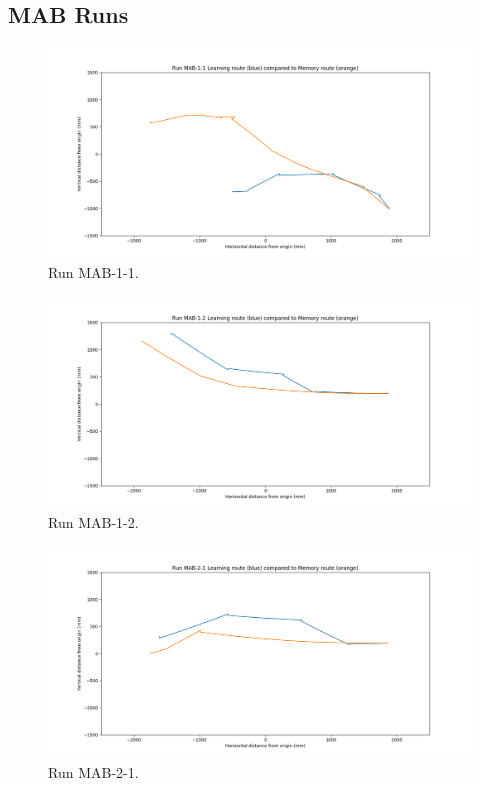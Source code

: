 \documentclass[a4paper,12pt,twoside,openright]{article}
\begin{document}
\subsection{MAB Runs}

\begin{figure}[h!]
 \centering
  \includegraphics[width=\textwidth]{MAB-1-1}
  \caption{
    \label{fig:mab-1-1} Run MAB-1-1.
  }
\end{figure}

\begin{figure}[h!]
 \centering
  \includegraphics[width=\textwidth]{MAB-1-2}
  \caption{
    \label{fig:mab-1-2} Run MAB-1-2.
  }
\end{figure}

\begin{figure}[h!]
 \centering
  \includegraphics[width=\textwidth]{MAB-2-1}
  \caption{
    \label{fig:mab-2-1} Run MAB-2-1.
  }
\end{figure}
\end{document}
